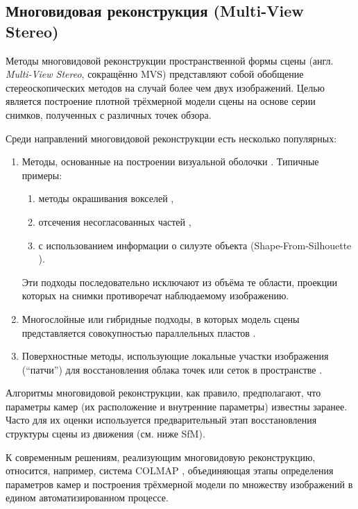 \subsection{Многовидовая реконструкция (Multi-View Stereo)}

Методы многовидовой реконструкции пространственной формы сцены (англ.
\emph{Multi-View Stereo}, сокращённо MVS) представляют собой обобщение
стереоскопических методов на случай более чем двух изображений. Целью
является построение плотной трёхмерной модели сцены на основе серии снимков,
полученных с различных точек обзора.

Среди направлений многовидовой реконструкции есть несколько популярных:

\begin{enumerate}
	\item Методы, основанные на построении визуальной оболочки \cite{10.1109/34.273735}.
	Типичные примеры:
	\begin{enumerate}
		\item методы окрашивания вокселей \cite{10.5555/794189.794361},
		\item отсечения несогласованных частей \cite{10.5555/898435},
		\item с использованием информации о силуэте объекта (Shape-From-Silhouette \cite{Matusik2002VHull}).
	\end{enumerate}
	Эти подходы последовательно исключают из объёма те области, проекции которых
	на снимки противоречат наблюдаемому изображению.

	\item Многослойные или гибридные подходы, в которых модель сцены
	представляется совокупностью параллельных пластов \cite{10.1109/CVPR.1998.698642}.

	\item Поверхностные методы, использующие локальные участки изображения
	(``патчи'') для восстановления облака точек или сеток в пространстве \cite{10.1109/CVPR.2007.383246}.

\end{enumerate}

Алгоритмы многовидовой реконструкции, как правило, предполагают, что параметры
камер (их расположение и внутренние параметры) известны заранее. Часто для их
оценки используется предварительный этап восстановления структуры сцены из
движения (см. ниже SfM).

К современным решениям, реализующим многовидовую реконструкцию,
относится, например, система COLMAP \cite{schoenberger2016mvs}, объединяющая этапы определения параметров
камер и построения трёхмерной модели по множеству изображений в едином
автоматизированном процессе.

